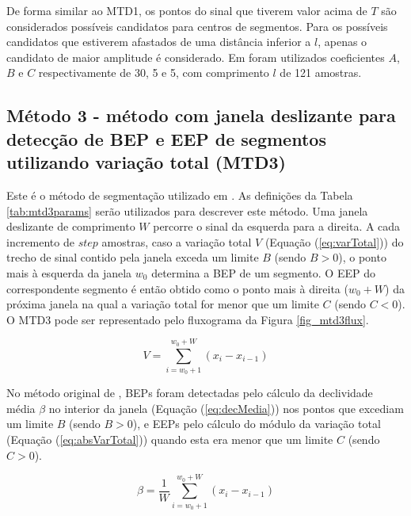 



De forma similar ao MTD1, os pontos do sinal que tiverem valor acima de $T$ são considerados possíveis candidatos para centros de segmentos. Para os possíveis candidatos que estiverem afastados de uma distância inferior a $l$, apenas o candidato de maior amplitude é considerado. Em \cite{Katsis2006} foram utilizados coeficientes $A$, $B$ e $C$ respectivamente de 30, 5 e 5, com comprimento $l$ de 121 amostras.

			\subsection{Método 3 - método com janela deslizante para detecção de BEP e EEP de segmentos utilizando variação total (MTD3)}
Este é o método de segmentação utilizado em \cite{Gut2000}. As definições da Tabela \ref{tab:mtd3params} serão utilizados para descrever este método. Uma janela deslizante de comprimento $W$ percorre o sinal da esquerda para a direita. A cada incremento de $step$ amostras, caso a variação total $V$ (Equação (\ref{eq:varTotal})) do trecho de sinal contido pela janela exceda um limite $B$ (sendo $B > 0$), o ponto mais à esquerda da janela $w_0$ determina a BEP de um segmento. O EEP do correspondente segmento é então obtido como o ponto mais à direita ($w_0 + W$) da próxima janela na qual a variação total for menor que um limite $C$ (sendo $C < 0$). O MTD3 pode ser representado pelo fluxograma da Figura \ref{fig_mtd3flux}.



\begin{equation}
\label{eq:varTotal}
	V = \sum\limits_{i=w_0+1}^{w_0+W} (x_i - x_{i-1})
\end{equation}



No método original de \cite{Gut2000}, BEPs foram detectadas pelo cálculo da declividade média $\beta$ no interior da janela (Equação (\ref{eq:decMedia})) nos pontos que excediam um limite $B$ (sendo $B > 0$), e EEPs pelo cálculo do módulo da variação total (Equação (\ref{eq:absVarTotal})) quando esta era menor que um limite $C$ (sendo $C > 0$).

\begin{equation}
\label{eq:decMedia}
	\beta = \frac{1}{W}\sum\limits_{i=w_0+1}^{w_0+W} (x_i - x_{i-1})
\end{equation}

